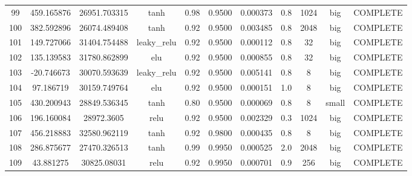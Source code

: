 \begin{longtable}{ccccccccccc}
                       99 &                 459.165876 &                       26951.703315 &            tanh &        0.98 & 0.9500 &       0.000373 &             0.8 &     1024 &       big & COMPLETE \\
                      100 &                 382.592896 &                       26074.489408 &            tanh &        0.92 & 0.9500 &       0.003485 &             0.8 &     2048 &       big & COMPLETE \\
                      101 &                 149.727066 &                       31404.754488 &     leaky\_relu &        0.92 & 0.9500 &       0.000112 &             0.8 &       32 &       big & COMPLETE \\
                      102 &                 135.139583 &                       31780.862899 &             elu &        0.92 & 0.9500 &       0.000855 &             0.8 &       32 &       big & COMPLETE \\
                      103 &                 -20.746673 &                       30070.593639 &     leaky\_relu &        0.92 & 0.9500 &       0.005141 &             0.8 &        8 &       big & COMPLETE \\
                      104 &                  97.186719 &                       30159.749764 &             elu &        0.92 & 0.9500 &       0.000151 &             1.0 &        8 &       big & COMPLETE \\
                      105 &                 430.200943 &                       28849.536345 &            tanh &        0.80 & 0.9500 &       0.000069 &             0.8 &        8 &     small & COMPLETE \\
                      106 &                 196.160084 &                         28972.3605 &            relu &        0.92 & 0.9500 &       0.002329 &             0.3 &     1024 &       big & COMPLETE \\
                      107 &                 456.218883 &                       32580.962119 &            tanh &        0.92 & 0.9800 &       0.000435 &             0.8 &        8 &       big & COMPLETE \\
                      108 &                 286.875677 &                       27470.326513 &            tanh &        0.99 & 0.9950 &       0.000525 &             2.0 &     2048 &       big & COMPLETE \\
                      109 &                  43.881275 &                        30825.08031 &            relu &        0.92 & 0.9950 &       0.000701 &             0.9 &      256 &       big & COMPLETE \\

\end{longtable}
